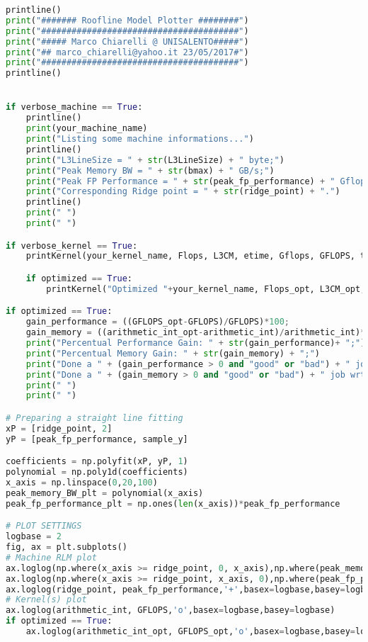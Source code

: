 \begin{lstlisting}[language=python,breaklines=true]
printline()
print("####### Roofline Model Plotter ########")
print("#######################################")
print("##### Marco Chiarelli @ UNISALENTO#####")
print("## marco_chiarelli@yahoo.it 23/05/2017#")
print("#######################################")
printline()


if verbose_machine == True:
    printline()
    print(your_machine_name)
    print("Listing some machine informations...")
    printline()
    print("L3LineSize = " + str(L3LineSize) + " byte;")
    print("Peak Memory BW = " + str(bmax) + " GB/s;")
    print("Peak FP Performance = " + str(peak_fp_performance) + " Gflops/s;")
    print("Corresponding Ridge point = " + str(ridge_point) + ".")
    printline()
    print(" ")
    print(" ")

if verbose_kernel == True:
    printKernel(your_kernel_name, Flops, L3CM, etime, Gflops, GFLOPS, traffic, arithmetic_int) 

    if optimized == True:
        printKernel("Optimized "+your_kernel_name, Flops_opt, L3CM_opt, etime_opt, Gflops_opt, GFLOPS_opt, traffic_opt, arithmetic_int_opt) 

if optimized == True:
    gain_performance = ((GFLOPS_opt-GFLOPS)/GFLOPS)*100;
    gain_memory = ((arithmetic_int_opt-arithmetic_int)/arithmetic_int)*100;
    print("Percentual Performance Gain: " + str(gain_performance)+ ";")
    print("Percentual Memory Gain: " + str(gain_memory) + ";")
    print("Done a " + (gain_performance > 0 and "good" or "bad") + " job wrt FP performance;")
    print("Done a " + (gain_memory > 0 and "good" or "bad") + " job wrt memory.")
    print(" ")
    print(" ")

# Preparing a straight line fitting
xP = [ridge_point, 2]
yP = [peak_fp_performance, sample_y]

coefficients = np.polyfit(xP, yP, 1)
polynomial = np.poly1d(coefficients)
x_axis = np.linspace(0,20,100)
peak_memory_BW_plt = polynomial(x_axis)
peak_fp_performance_plt = np.ones(len(x_axis))*peak_fp_performance

# PLOT SETTINGS
logbase = 2
fig, ax = plt.subplots()
# Machine RLM plot
ax.loglog(np.where(x_axis >= ridge_point, 0, x_axis),np.where(peak_memory_BW_plt >= peak_fp_performance, 0, peak_memory_BW_plt),'-',basex=logbase,basey=logbase,linewidth=2.5)
ax.loglog(np.where(x_axis >= ridge_point, x_axis, 0),np.where(peak_fp_performance_plt > peak_memory_BW_plt, 0, peak_fp_performance_plt),'-',basex=logbase,basey=logbase,linewidth=2.5)
ax.loglog(ridge_point, peak_fp_performance,'+',basex=logbase,basey=logbase,markeredgewidth=3,markersize=10)
# Kernel(s) plot
ax.loglog(arithmetic_int, GFLOPS,'o',basex=logbase,basey=logbase)
if optimized == True:
    ax.loglog(arithmetic_int_opt, GFLOPS_opt,'o',basex=logbase,basey=logbase)


\end{lstlisting}
